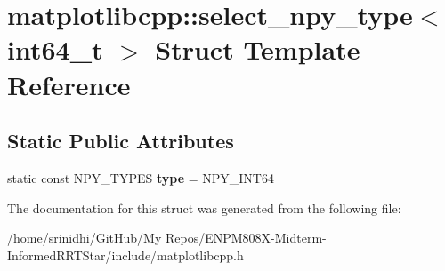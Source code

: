 \hypertarget{structmatplotlibcpp_1_1select__npy__type_3_01int64__t_01_4}{}\section{matplotlibcpp\+:\+:select\+\_\+npy\+\_\+type$<$ int64\+\_\+t $>$ Struct Template Reference}
\label{structmatplotlibcpp_1_1select__npy__type_3_01int64__t_01_4}
\subsection*{Static Public Attributes}
\begin{DoxyCompactItemize}
\item 
static const N\+P\+Y\+\_\+\+T\+Y\+P\+ES {\bfseries type} = N\+P\+Y\+\_\+\+I\+N\+T64\hypertarget{structmatplotlibcpp_1_1select__npy__type_3_01int64__t_01_4_a0d20ea35e520ad9381aca3c173f3f02d}{}\label{structmatplotlibcpp_1_1select__npy__type_3_01int64__t_01_4_a0d20ea35e520ad9381aca3c173f3f02d}

\end{DoxyCompactItemize}


The documentation for this struct was generated from the following file\+:\begin{DoxyCompactItemize}
\item 
/home/srinidhi/\+Git\+Hub/\+My Repos/\+E\+N\+P\+M808\+X-\/\+Midterm-\/\+Informed\+R\+R\+T\+Star/include/matplotlibcpp.\+h\end{DoxyCompactItemize}
